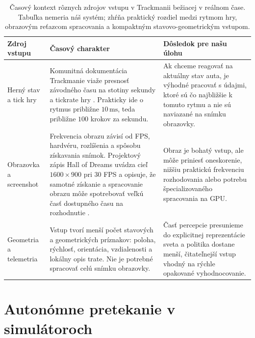\begin{table}[htbp]
    \centering
    \small
    \setlength{\tabcolsep}{4pt}
    \renewcommand{\arraystretch}{1.18}
    \caption[Časový kontext obrazového vstupu]{Časový kontext rôznych zdrojov vstupu v Trackmanii bežiacej v reálnom čase. Tabuľka nemeria náš systém; zhŕňa praktický rozdiel medzi rytmom hry, obrazovým reťazcom spracovania a kompaktným stavovo-geometrickým vstupom.}
    \label{tab:related_input_frequency}
    \begin{tabular}{>{\raggedright\arraybackslash}p{}
                    >{\raggedright\arraybackslash}p{}
                    >{\raggedright\arraybackslash}p{}}
        \toprule
        Zdroj vstupu & Časový charakter & Dôsledok pre našu úlohu \\
        \midrule
        Herný stav a tick hry &
        Komunitná dokumentácia Trackmanie viaže presnosť závodného času na stotiny sekundy a tickrate hry \cite{trackmania_wiki_units2026}. Prakticky ide o rytmus približne \(10\,\mathrm{ms}\), teda približne \(100\) krokov za sekundu. &
        Ak chceme reagovať na aktuálny stav auta, je výhodné pracovať s údajmi, ktoré sú čo najbližšie k tomuto rytmu a nie sú naviazané na snímku obrazovky. \\
        Obrazovka a screenshot &
        Frekvencia obrazu závisí od FPS, hardvéru, rozlíšenia a spôsobu získavania snímok. Projektový zápis Hall of Dreams uvádza cieľ \(1600\times900\) pri \(30\) FPS a opisuje, že samotné získanie a spracovanie obrazu môže spotrebovať veľkú časť dostupného času na rozhodnutie \cite{hallofdreams_trackmania_eyes2026}. &
        Obraz je bohatý vstup, ale môže priniesť oneskorenie, nižšiu praktickú frekvenciu rozhodovania alebo potrebu špecializovaného spracovania na GPU. \\
        Geometria a telemetria &
        Vstup tvorí menší počet stavových a geometrických príznakov: poloha, rýchlosť, orientácia, vzdialenosti a lokálny opis trate. Nie je potrebné spracovať celú snímku obrazovky. &
        Časť percepcie presunieme do explicitnej reprezentácie sveta a politika dostane menší, čitateľnejší vstup vhodný na rýchle opakované vyhodnocovanie. \\
        \bottomrule
    \end{tabular}
\end{table}

\section{Autonómne pretekanie v simulátoroch}

